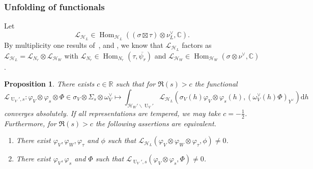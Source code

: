 \documentclass[letterpaper,11pt]{amsart}
\newcommand{\C}{\mathbb{C}}
\newcommand{\R}{\mathbb{R}}
\newcommand{\cH}{\mathcal{H}}
\newcommand{\cL}{\mathcal{L}}
\newcommand{\rd}{\mathrm{d}}
\newcommand{\<}{\negthickspace}
\DeclareMathOperator{\U}{U}
\DeclareMathOperator{\Hom}{Hom}
\theoremstyle{definition}
\theoremstyle{plain}
\newtheorem{prop}[definition]{Proposition}
\theoremstyle{remark}
\numberwithin{equation}{section}
\begin{document}
\subsubsection{Unfolding of functionals}
Let
\begin{equation*}
    \cL_{\cH_L} \in \Hom_{\cH_L}(( \sigma \boxtimes \tau) \otimes \nu^\vee_L, \C).
\end{equation*}
By multiplicity one results of~\cite{Sun}, \cite{GGP} and \cite{LiuSun}, we know that $\cL_{\cH_L}$ factors as $\cL_{\cH_L}=\cL_{N_r} \otimes \cL_{\cH_W}$ with $\cL_{N_r} \in \Hom_{N_r}(\tau , \overline{\psi_r})$ and $\cL_{\cH_W} \in \Hom_{\cH_W}(\sigma \otimes \nu^\vee,\C)$.


\begin{prop}
\label{prop:corank_reduction}
    There exists $c \in \R$ such that for $\Re(s)>c$ the functional 
    \begin{equation}
    \label{eq:L_U_defi}
        \cL_{\U_V',s}:  \varphi_V \otimes \varphi_s \otimes \Phi \in  \sigma_V \otimes \Sigma_s\otimes \omega^\vee_V \mapsto \int_{\cH_W' \backslash \U_V'} \cL_{\cH_L}(\sigma_V(h) \varphi_V \otimes \varphi_s(h) , (\omega^\vee_V(h)\Phi)_{Y^\vee}) \rd h
    \end{equation}
    converges absolutely. If all representations are tempered, we may take $c=-\frac{1}{2}$. Furthermore, for $\Re(s)>c$ the following assertions are equivalent.
\begin{enumerate}
    \item There exist $\varphi_V, \varphi_W, \varphi_{\tau}$ and $\phi$ such that $\cL_{\cH_L}(\varphi_V \otimes \varphi_W \otimes \varphi_\tau ,  \phi) \neq 0$.
    \item There exist $\varphi_V, \varphi_s$ and $\Phi$ such that $\cL_{\U_V',s}(\varphi_V \otimes \varphi_s , \Phi) \neq 0$.
\end{enumerate}
\end{prop}
\end{document}
